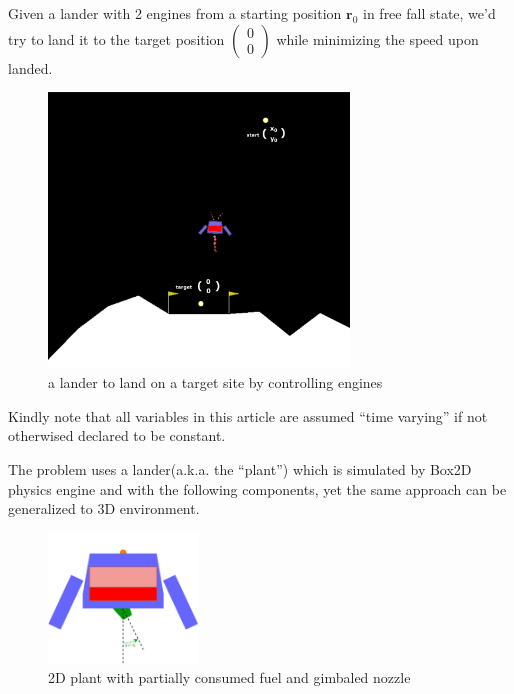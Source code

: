 \documentclass[notitlepage,twocolumn,10pt]{article}
\begin{document}
Given a lander with 2 engines from a starting position $\mathbf{r}_{0}$ in free fall state, we'd try to land it to the target position $\left( \begin{matrix} 0 \\ 0 \end{matrix} \right)$ while minimizing the speed upon landed.

\begin{figure}[H] %
    \centering
    \includegraphics[width=8.0cm, keepaspectratio]{problem_desc}
    \caption{a lander to land on a target site by controlling engines}
    \label{fig:problem_desc}
\end{figure}

Kindly note that all variables in this article are assumed ``time varying'' if not otherwised declared to be constant.

The problem uses a lander(a.k.a. the ``plant'') which is simulated by Box2D physics engine and with the following components, yet the same approach can be generalized to 3D environment.
\begin{figure}[H] %
    \centering
    \includegraphics[width=4.0cm, keepaspectratio]{plant_geometry}
    \caption{2D plant with partially consumed fuel and gimbaled nozzle}
    \label{fig:plant_geometry}
\end{figure}
\end{document}
